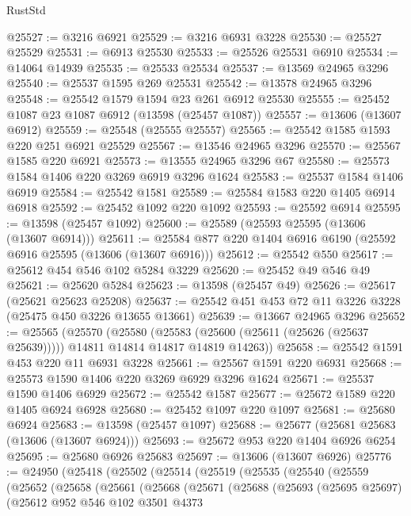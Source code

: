 \begin{lexlean}{RustStd}
\begin{coremodule}
@25527 := @3216 @6921
@25529 := @3216 @6931 @3228
@25530 := @25527 @25529
@25531 := @6913 @25530
@25533 := @25526 @25531 @6910
@25534 := @14064 @14939
@25535 := @25533 @25534
@25537 := @13569 @24965 @3296
@25540 := @25537 @1595 @269 @25531
@25542 := @13578 @24965 @3296
@25548 := @25542 @1579 @1594 @23 @261 @6912 @25530
@25555 := @25452 @1087 @23 @1087 @6912 (@13598 (@25457 @1087))
@25557 := @13606 (@13607 @6912)
@25559 := @25548 (@25555 @25557)
@25565 := @25542 @1585 @1593 @220 @251 @6921 @25529
@25567 := @13546 @24965 @3296
@25570 := @25567 @1585 @220 @6921
@25573 := @13555 @24965 @3296 @67
@25580 := @25573 @1584 @1406 @220 @3269 @6919 @3296 @1624
@25583 := @25537 @1584 @1406 @6919
@25584 := @25542 @1581
@25589 := @25584 @1583 @220 @1405 @6914 @6918
@25592 := @25452 @1092 @220 @1092
@25593 := @25592 @6914
@25595 := @13598 (@25457 @1092)
@25600 := @25589 (@25593 @25595 (@13606 (@13607 @6914)))
@25611 := @25584 @877 @220 @1404 @6916 @6190 (@25592 @6916 @25595 (@13606 (@13607 @6916)))
@25612 := @25542 @550
@25617 := @25612 @454 @546 @102 @5284 @3229
@25620 := @25452 @49 @546 @49
@25621 := @25620 @5284
@25623 := @13598 (@25457 @49)
@25626 := @25617 (@25621 @25623 @25208)
@25637 := @25542 @451 @453 @72 @11 @3226 @3228 (@25475 @450 @3226 @13655 @13661)
@25639 := @13667 @24965 @3296
@25652 := @25565
    (@25570
      (@25580
        (@25583 (@25600 (@25611 (@25626 (@25637 @25639)))))
        @14811
        @14814
        @14817
        @14819
        @14263))
@25658 := @25542 @1591 @453 @220 @11 @6931 @3228
@25661 := @25567 @1591 @220 @6931
@25668 := @25573 @1590 @1406 @220 @3269 @6929 @3296 @1624
@25671 := @25537 @1590 @1406 @6929
@25672 := @25542 @1587
@25677 := @25672 @1589 @220 @1405 @6924 @6928
@25680 := @25452 @1097 @220 @1097
@25681 := @25680 @6924
@25683 := @13598 (@25457 @1097)
@25688 := @25677 (@25681 @25683 (@13606 (@13607 @6924)))
@25693 := @25672 @953 @220 @1404 @6926 @6254
@25695 := @25680 @6926 @25683
@25697 := @13606 (@13607 @6926)
@25776 := @24950
    (@25418
      (@25502
        (@25514
          (@25519
            (@25535
              (@25540
                (@25559
                  (@25652
                    (@25658
                      (@25661
                        (@25668
                          (@25671
                            (@25688
                              (@25693
                                (@25695 @25697)
                                (@25612
                                  @952
                                  @546
                                  @102
                                  @3501
                                  @4373

\end{coremodule}
\end{lexlean}
